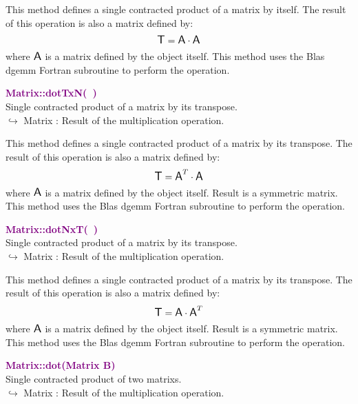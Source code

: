 This method defines a single contracted product of a matrix by itself.
The result of this operation is also a matrix defined by:
\begin{equation*}
\mbox{\large\ensuremath{\mathsf{T}}} = \mbox{\large\ensuremath{\mathsf{A}}} \cdot \mbox{\large\ensuremath{\mathsf{A}}}
\end{equation*}
where $\mbox{\large\ensuremath{\mathsf{A}}}$ is a matrix defined by the object itself.
This method uses the Blas \textsf{dgemm} Fortran subroutine to perform the operation.

\textcolor{purple}{\textbf{Matrix::dotTxN(~)}}\label{Matrix::dotTxN()}\\
Single contracted product of a matrix by its transpose.\\ \hspace*{10mm}$\hookrightarrow$ Matrix : Result of the multiplication operation.

This method defines a single contracted product of a matrix by its transpose.
The result of this operation is also a matrix defined by:
\begin{equation*}
\mbox{\large\ensuremath{\mathsf{T}}} = \mbox{\large\ensuremath{\mathsf{A}}}^T\cdot \mbox{\large\ensuremath{\mathsf{A}}}
\end{equation*}
where $\mbox{\large\ensuremath{\mathsf{A}}}$ is a matrix defined by the object itself. Result is a symmetric matrix.
This method uses the Blas \textsf{dgemm} Fortran subroutine to perform the operation.

\textcolor{purple}{\textbf{Matrix::dotNxT(~)}}\label{Matrix::dotNxT()}\\
Single contracted product of a matrix by its transpose.\\ \hspace*{10mm}$\hookrightarrow$ Matrix : Result of the multiplication operation.

This method defines a single contracted product of a matrix by its transpose.
The result of this operation is also a matrix defined by:
\begin{equation*}
\mbox{\large\ensuremath{\mathsf{T}}} = \mbox{\large\ensuremath{\mathsf{A}}} \cdot \mbox{\large\ensuremath{\mathsf{A}}}^T
\end{equation*}
where $\mbox{\large\ensuremath{\mathsf{A}}}$ is a matrix defined by the object itself. Result is a symmetric matrix.
This method uses the Blas \textsf{dgemm} Fortran subroutine to perform the operation.

\textcolor{purple}{\textbf{Matrix::dot(Matrix B)}}\label{Matrix::dot(Matrix B)}\\
Single contracted product of two matrixs.\\ \hspace*{10mm}$\hookrightarrow$ Matrix : Result of the multiplication operation.

